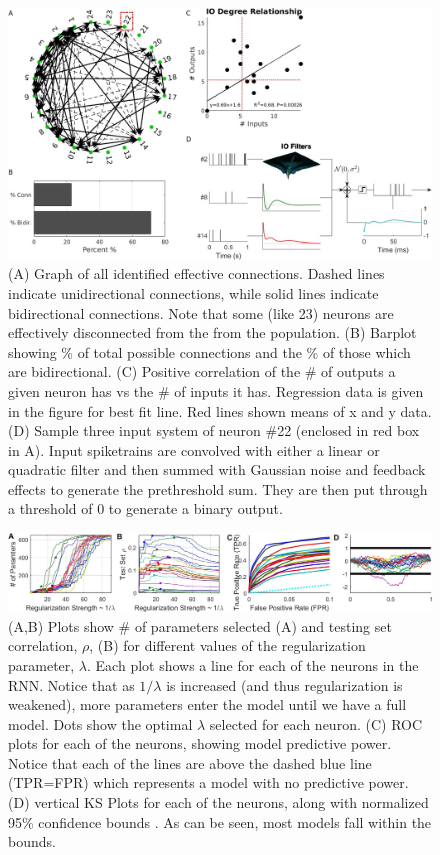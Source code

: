 \documentclass[11pt,a4paper,final]{article}
\begin{document}
\begin{figure}[!ht]
	\centering
	\includegraphics[width=160mm]{graph}
	\caption[Graph \& Example System]{
		(A) Graph of all identified effective connections. Dashed lines indicate unidirectional connections, while solid lines indicate bidirectional connections. Note that some (like 23) neurons are effectively disconnected from the from the population.
		(B) Barplot showing \% of total possible connections and the \% of those which are bidirectional.
		(C) Positive correlation of the \# of outputs a given neuron has vs the \# of inputs it has. Regression data is given in the figure for best fit line. Red lines shown means of x and y data.
		(D) Sample three input system of neuron \#22 (enclosed in red box in A). Input spiketrains are convolved with either a linear or quadratic filter and then summed with Gaussian noise and feedback effects to generate the prethreshold sum. They are then put through a threshold of 0 to generate a binary output.}
	\label{graph}
\end{figure}

\begin{figure}[!ht]
	\centering
	\includegraphics[width=170mm]{regpath}
	\caption[Regularization Path]{
		(A,B) Plots show \# of parameters selected (A) and testing set correlation, $\rho$, (B) for different values of the regularization parameter, $\lambda$. Each plot shows a line for each of the \nn{} neurons in the RNN. Notice that as $1/\lambda$ is increased (and thus regularization is weakened), more parameters enter the model until we have a full model. Dots show the optimal $\lambda$ selected for each neuron.
		(C) ROC plots for each of the \nn{} neurons, showing model predictive power. Notice that each of the lines are above the dashed blue line (TPR=FPR) which represents a model with no predictive power.
		(D) vertical KS Plots for each of the \nn{} neurons, along with normalized 95\% confidence bounds \citep{song13sparse}. As can be seen, most models fall within the bounds.}
	\label{regpath}
\end{figure}
\end{document}
